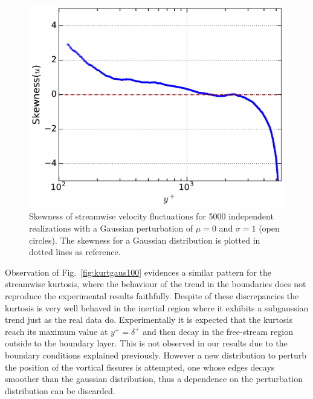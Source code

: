\documentclass[aps,reprint,amsmath,amssymb,pra,floatfix]{revtex4-1}%
\begin{document}
\begin{figure}[tb]
\includegraphics[scale=0.46]{figures/skewness_5000_assembles_gauss100}
\caption{\label{fig:skewgaus100} Skewness of streamwise velocity fluctuations for 5000 independent realizations with a Gaussian perturbation of $\mu=0$ and $\sigma=1$ (open circles). The skewness for a Gaussian distribution is plotted in dotted lines as reference.}
\end{figure}
Observation of Fig.~\ref{fig:kurtgaus100} evidences a similar pattern for the streamwise kurtosis, where the behaviour of the trend in the boundaries does not reproduce the experimental results faithfully. Despite of these discrepancies the kurtosis is very well behaved in the inertial region where it exhibits a subgaussian trend just as the real data do. Experimentally it is expected that the kurtosis reach its maximum value at $y^+=\delta^+$ and then decay in the free-stream region outside to the boundary layer. This is not observed in our results due to the boundary conditions explained previously. However a new distribution to perturb the position of the vortical fissures is attempted, one whose edges decays smoother than the gaussian distribution, thus a dependence on the perturbation distribution can be discarded.
\end{document}
